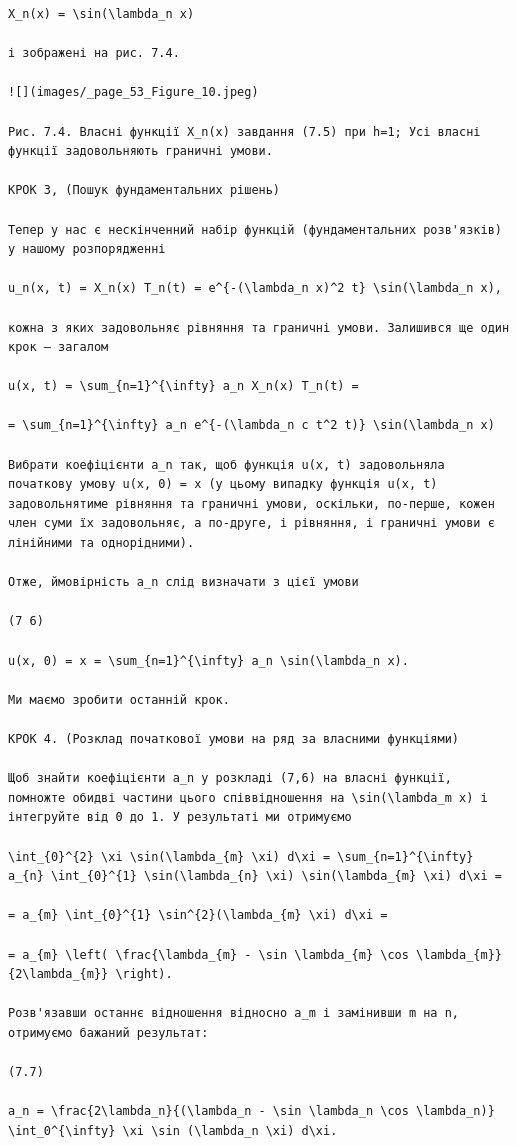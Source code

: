 \documentclass[
  ukrainian,
]{article}
\begin{document}
\begin{verbatim}
X_n(x) = \sin(\lambda_n x)

і зображені на рис. 7.4.

![](images/_page_53_Figure_10.jpeg)

Рис. 7.4. Власні функції X_n(x) завдання (7.5) при h=1; Усі власні функції задовольняють граничні умови.

КРОК 3, (Пошук фундаментальних рішень)

Тепер у нас є нескінченний набір функцій (фундаментальних розв'язків) у нашому розпорядженні

u_n(x, t) = X_n(x) T_n(t) = e^{-(\lambda_n x)^2 t} \sin(\lambda_n x),

кожна з яких задовольняє рівняння та граничні умови. Залишився ще один крок — загалом

u(x, t) = \sum_{n=1}^{\infty} a_n X_n(x) T_n(t) =

= \sum_{n=1}^{\infty} a_n e^{-(\lambda_n c t^2 t)} \sin(\lambda_n x)

Вибрати коефіцієнти a_n так, щоб функція u(x, t) задовольняла початкову умову u(x, 0) = x (у цьому випадку функція u(x, t) задовольнятиме рівняння та граничні умови, оскільки, по-перше, кожен член суми їх задовольняє, а по-друге, і рівняння, і граничні умови є лінійними та однорідними).

Отже, ймовірність a_n слід визначати з цієї умови

(7 6)

u(x, 0) = x = \sum_{n=1}^{\infty} a_n \sin(\lambda_n x).

Ми маємо зробити останній крок.

КРОК 4. (Розклад початкової умови на ряд за власними функціями)

Щоб знайти коефіцієнти a_n у розкладі (7,6) на власні функції, помножте обидві частини цього співвідношення на \sin(\lambda_m x) і інтегруйте від 0 до 1. У результаті ми отримуємо

\int_{0}^{2} \xi \sin(\lambda_{m} \xi) d\xi = \sum_{n=1}^{\infty} a_{n} \int_{0}^{1} \sin(\lambda_{n} \xi) \sin(\lambda_{m} \xi) d\xi =

= a_{m} \int_{0}^{1} \sin^{2}(\lambda_{m} \xi) d\xi =

= a_{m} \left( \frac{\lambda_{m} - \sin \lambda_{m} \cos \lambda_{m}}{2\lambda_{m}} \right).

Розв'язавши останнє відношення відносно a_m і замінивши m на n, отримуємо бажаний результат:

(7.7)

a_n = \frac{2\lambda_n}{(\lambda_n - \sin \lambda_n \cos \lambda_n)} \int_0^{\infty} \xi \sin (\lambda_n \xi) d\xi.


\end{verbatim}
\end{document}
